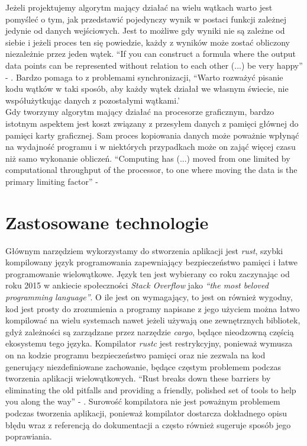 \documentclass[12pt, letterpaper]{report}
\begin{document}
    Jeżeli projektujemy algorytm mający działać na wielu wątkach warto jest pomyśleć o tym, jak
    przedstawić pojedynczy wynik w postaci funkcji zależnej jedynie od danych wejściowych. Jest to 
    możliwe gdy wyniki nie są zależne od siebie i jeżeli proces ten się powiedzie, każdy 
    z wyników może zostać obliczony niezależnie przez jeden wątek.
    ``If you can construct a formula where the output data points can be represented without 
    relation to each other (...) be very happy'' - \cite{cuda}.
    Bardzo pomaga to z problemami synchronizacji,  
    ``Warto rozważyć pisanie kodu wątków w taki sposób, aby każdy wątek działał we 
    własnym świecie, nie współużytkując 
    danych z pozostałymi wątkami.' \cite{cleancode} \\
    
    Gdy tworzymy algorytm mający działać na procesorze graficznym, bardzo istotnym aspektem jest 
    koszt związany z przesyłem danych z pamięci głównej do pamięci karty graficznej. Sam proces kopiowania 
    danych może poważnie wpłynąć na wydajność programu i w niektórych przypadkach może on zająć więcej
    czasu niż samo wykonanie obliczeń.
    ``Computing has (...) moved from one limited by computational throughput of the 
    processor, to one where moving the data is the primary limiting factor'' - \cite{cuda}
    

    \section{Zastosowane technologie}

    Głównym narzędziem wykorzystamy do stworzenia aplikacji jest \emph{rust}, szybki kompilowany 
    język programowania zapewniający bezpieczeństwo pamięci i łatwe programowanie wielowątkowe. 
    Język ten jest wybierany co roku zaczynając od roku 2015 w ankiecie społeczności \emph{Stack Overflow} jako 
    \emph{``the most beloved programming language''}. O ile jest on wymagający, to jest 
    on również wygodny, kod jest prosty do zrozumienia a programy napisane z jego użyciem 
    można łatwo kompilować na wielu systemach nawet jeżeli używają one zewnętrznych bibliotek, gdyż 
    zależności są zarządzane przez narzędzie \emph{cargo}, będące nieodzowną częścią ekosystemu tego języka.
    Kompilator \emph{rustc} jest restrykcyjny, ponieważ wymusza on na kodzie programu bezpieczeństwo pamięci oraz
    nie zezwala na kod generujący niezdefiniowane zachowanie, będące częstym problemem podczas tworzenia aplikacji
    wielowątkowych. ``Rust breaks down these barriers by eliminating the old pitfalls and providing a friendly, 
    polished set of tools to help you along the way'' - \cite{rustbook}. Surowość kompilatora 
    nie jest poważnym problemem podczas tworzenia aplikacji, ponieważ kompilator dostarcza dokładnego opisu 
    błędu wraz z referencją do dokumentacji a często również sugeruje sposób jego poprawiania. \\
\end{document}
